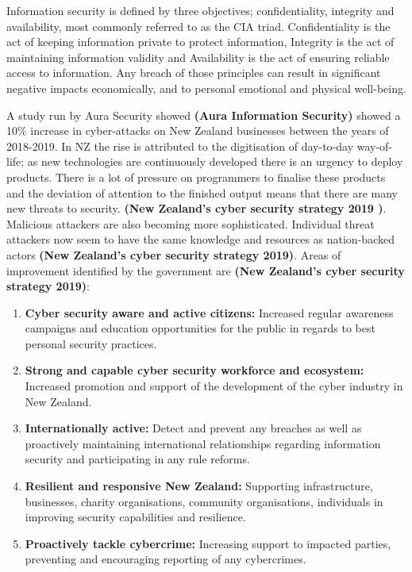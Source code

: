 Information security is defined by three objectives; confidentiality, integrity and availability, most commonly referred to as the CIA triad. Confidentiality is the act of keeping information private to protect information, Integrity is the act of maintaining information validity and Availability is the act of ensuring reliable access to information.  Any breach of those principles can result in significant negative impacts economically, and to personal emotional and physical well-being. 
\newline
\par A study run by Aura Security showed \textbf{(Aura Information Security)} showed a 10\% increase in cyber-attacks on New Zealand businesses between the years of 2018-2019. In NZ the rise is attributed to the digitisation of day-to-day way-of-life; as new technologies are continuously developed there is an urgency to deploy products. There is a lot of pressure on programmers to finalise these products and the deviation of attention to the finished output means that there are many new threats to security. \textbf{(New Zealand’s cyber security strategy 2019 )}. Malicious attackers are also becoming more sophisticated. Individual threat attackers now seem to have the same knowledge and resources as nation-backed actors \textbf{(New Zealand’s cyber security strategy 2019)}.
\newline
\newline
Areas of improvement identified by the government are \textbf{(New Zealand’s cyber security strategy 2019)}:

\begin{enumerate}
    \item \textbf{Cyber security aware and active citizens:} Increased regular awareness campaigns and education opportunities for the public in regards to best personal security practices. 
    \item \textbf{Strong and capable cyber security workforce and ecosystem:} Increased promotion and support of the development of the cyber industry in New Zealand.
    \item \textbf{Internationally active:} Detect and prevent any breaches as well as proactively maintaining international relationships regarding information security and participating in any rule reforms. 
    \item \textbf{Resilient and responsive New Zealand:} Supporting infrastructure, businesses, charity organisations, community organisations, individuals in improving security capabilities and resilience.
    \item \textbf{Proactively tackle cybercrime:} Increasing support to impacted parties,  preventing and encouraging reporting of any cybercrimes. 
\end{enumerate}

